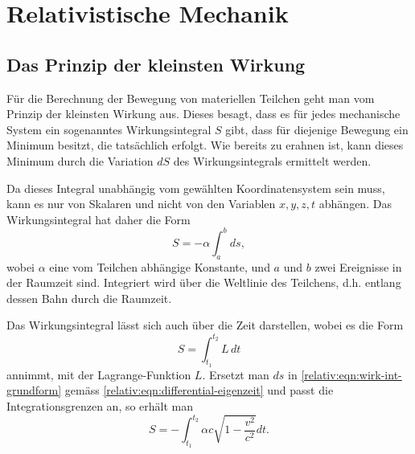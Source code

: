 
\section{Relativistische Mechanik 
\label{relativ:section:rel_mechanik}}

\subsection{Das Prinzip der kleinsten Wirkung 
\label{relativ:section:kleinste-wirkung}}

Für die Berechnung der Bewegung von materiellen Teilchen geht man
vom Prinzip der kleinsten Wirkung aus.
Dieses besagt, dass es für jedes mechanische System ein sogenanntes
Wirkungsintegral \(S\) gibt,
dass für diejenige Bewegung ein Minimum besitzt, die tatsächlich erfolgt.
Wie bereits zu erahnen ist, kann dieses Minimum durch die Variation \(dS\)
des Wirkungsintegrals ermittelt werden.

Da dieses Integral unabhängig vom gewählten Koordinatensystem sein muss,
kann es nur von Skalaren und nicht von den Variablen \(x, y, z, t\) abhängen.
Das Wirkungsintegral hat daher die Form
\begin{equation}
    S = - \alpha \int_{a}^{b} ds,
\label{relativ:eqn:wirk-int-grundform}
\end{equation}
wobei \(\alpha\) eine vom Teilchen abhängige Konstante,
und \(a\) und \(b\) zwei Ereignisse in der Raumzeit sind.
Integriert wird über die Weltlinie des Teilchens,
d.h. entlang dessen Bahn durch die Raumzeit.

Das Wirkungsintegral lässt sich auch über die Zeit darstellen,
wobei es die Form
\begin{equation}
    S = \int_{t_1}^{t_2} L \, dt
\label{relativ:eqn:wirk-int-zeit}
\end{equation}
annimmt, mit der Lagrange-Funktion \(L\).
Ersetzt man \(ds\) in \eqref{relativ:eqn:wirk-int-grundform}
gemäss \eqref{relativ:eqn:differential-eigenzeit} und passt
die Integrationsgrenzen an, so erhält man
\begin{equation}
    S = -\int_{t_1}^{t_2} \alpha c \sqrt{1-\frac{v^2}{c^2}} dt.
\end{equation}

